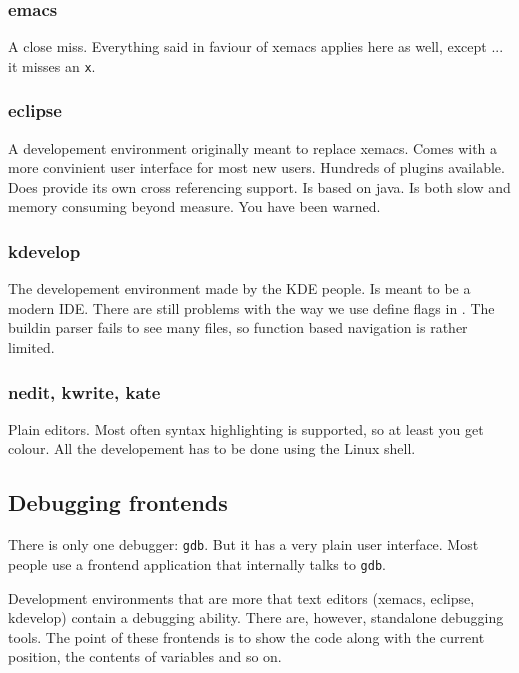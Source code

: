\subsubsection{emacs}

A close miss. Everything said in faviour of xemacs applies here as
well, except ... it misses an \texttt{x}.


\subsubsection{eclipse}

A developement environment originally meant to replace xemacs. Comes
with a more convinient user interface for most new users. Hundreds
of plugins available. Does provide its own cross referencing support.
Is based on java. Is both slow and memory consuming beyond measure.
You have been warned.


\subsubsection{kdevelop}

The developement environment made by the KDE people. Is meant to be
a modern IDE. There are still problems with the way we use define
flags in \ccarat{}. The buildin parser fails to see many files, so
function based navigation is rather limited.


\subsubsection{nedit, kwrite, kate}

Plain editors. Most often syntax highlighting is supported, so at
least you get colour. All the developement has to be done using the
Linux shell.


\subsection{Debugging frontends}

There is only one debugger: \texttt{gdb}. But it has a very plain
user interface. Most people use a frontend application that internally
talks to \texttt{gdb}.

Development environments that are more that text editors (xemacs,
eclipse, kdevelop) contain a debugging ability. There are, however,
standalone debugging tools. The point of these frontends is to show
the code along with the current position, the contents of variables
and so on.


